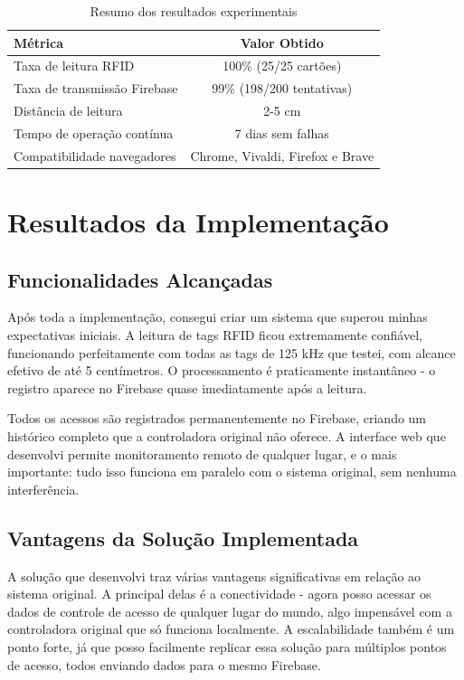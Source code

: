 \begin{table}[htbp]
\centering
\caption{Resumo dos resultados experimentais}
\label{tab:resultados}
\begin{tabular}{|l|c|}
\hline
\textbf{Métrica} & \textbf{Valor Obtido} \\
\hline
Taxa de leitura RFID & 100\% (25/25 cartões) \\
\hline
Taxa de transmissão Firebase & 99\% (198/200 tentativas) \\
\hline
Distância de leitura & 2-5 cm \\
\hline
Tempo de operação contínua & 7 dias sem falhas \\
\hline
Compatibilidade navegadores & Chrome, Vivaldi, Firefox e Brave \\
\hline
\end{tabular}
\end{table}

\section{Resultados da Implementação}
\label{sec:resultados-implementacao}

\subsection{Funcionalidades Alcançadas}

Após toda a implementação, consegui criar um sistema que superou minhas expectativas iniciais. A leitura de tags RFID ficou extremamente confiável, funcionando perfeitamente com todas as tags de 125 kHz que testei, com alcance efetivo de até 5 centímetros. O processamento é praticamente instantâneo - o registro aparece no Firebase quase imediatamente após a leitura.

Todos os acessos são registrados permanentemente no Firebase, criando um histórico completo que a controladora original não oferece. A interface web que desenvolvi permite monitoramento remoto de qualquer lugar, e o mais importante: tudo isso funciona em paralelo com o sistema original, sem nenhuma interferência.

\subsection{Vantagens da Solução Implementada}

A solução que desenvolvi traz várias vantagens significativas em relação ao sistema original. A principal delas é a conectividade - agora posso acessar os dados de controle de acesso de qualquer lugar do mundo, algo impensável com a controladora original que só funciona localmente. A escalabilidade também é um ponto forte, já que posso facilmente replicar essa solução para múltiplos pontos de acesso, todos enviando dados para o mesmo Firebase.


